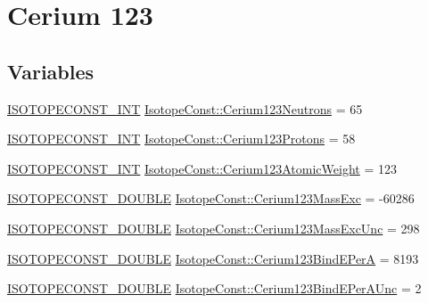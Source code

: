 \hypertarget{group___isotope_const-_cerium-_ce123}{}\section{Cerium 123}
\label{group___isotope_const-_cerium-_ce123}
\subsection*{Variables}
\begin{DoxyCompactItemize}
\item 
\mbox{\hyperlink{group___isotope_const-_macros_ga5f18360b3e99483a35c32d789e62621c}{I\+S\+O\+T\+O\+P\+E\+C\+O\+N\+S\+T\+\_\+\+I\+NT}} \mbox{\hyperlink{group___isotope_const-_cerium-_ce123_ga4aefa186ce91c1745e93851e9b60d68d}{Isotope\+Const\+::\+Cerium123\+Neutrons}} = 65
\item 
\mbox{\hyperlink{group___isotope_const-_macros_ga5f18360b3e99483a35c32d789e62621c}{I\+S\+O\+T\+O\+P\+E\+C\+O\+N\+S\+T\+\_\+\+I\+NT}} \mbox{\hyperlink{group___isotope_const-_cerium-_ce123_ga6ef26bea47ca01adf29aa44fb92a7817}{Isotope\+Const\+::\+Cerium123\+Protons}} = 58
\item 
\mbox{\hyperlink{group___isotope_const-_macros_ga5f18360b3e99483a35c32d789e62621c}{I\+S\+O\+T\+O\+P\+E\+C\+O\+N\+S\+T\+\_\+\+I\+NT}} \mbox{\hyperlink{group___isotope_const-_cerium-_ce123_ga1bf1dcab69aa1c8f7cd76020144affa7}{Isotope\+Const\+::\+Cerium123\+Atomic\+Weight}} = 123
\item 
\mbox{\hyperlink{group___isotope_const-_macros_ga8f45a7272ce02c0b4c65c44636ed719a}{I\+S\+O\+T\+O\+P\+E\+C\+O\+N\+S\+T\+\_\+\+D\+O\+U\+B\+LE}} \mbox{\hyperlink{group___isotope_const-_cerium-_ce123_ga1cdfc22c2a9dd17ba0983f25d6d3c963}{Isotope\+Const\+::\+Cerium123\+Mass\+Exc}} = -\/60286
\item 
\mbox{\hyperlink{group___isotope_const-_macros_ga8f45a7272ce02c0b4c65c44636ed719a}{I\+S\+O\+T\+O\+P\+E\+C\+O\+N\+S\+T\+\_\+\+D\+O\+U\+B\+LE}} \mbox{\hyperlink{group___isotope_const-_cerium-_ce123_ga1fb3f3c59dc6eb5cafd744c3440c1d78}{Isotope\+Const\+::\+Cerium123\+Mass\+Exc\+Unc}} = 298
\item 
\mbox{\hyperlink{group___isotope_const-_macros_ga8f45a7272ce02c0b4c65c44636ed719a}{I\+S\+O\+T\+O\+P\+E\+C\+O\+N\+S\+T\+\_\+\+D\+O\+U\+B\+LE}} \mbox{\hyperlink{group___isotope_const-_cerium-_ce123_ga0cedc54d215c1824c684d3f24c24970d}{Isotope\+Const\+::\+Cerium123\+Bind\+E\+PerA}} = 8193
\item 
\mbox{\hyperlink{group___isotope_const-_macros_ga8f45a7272ce02c0b4c65c44636ed719a}{I\+S\+O\+T\+O\+P\+E\+C\+O\+N\+S\+T\+\_\+\+D\+O\+U\+B\+LE}} \mbox{\hyperlink{group___isotope_const-_cerium-_ce123_ga5e487d0951ad22f67c29d8773d8a0098}{Isotope\+Const\+::\+Cerium123\+Bind\+E\+Per\+A\+Unc}} = 2

\end{DoxyCompactItemize}

